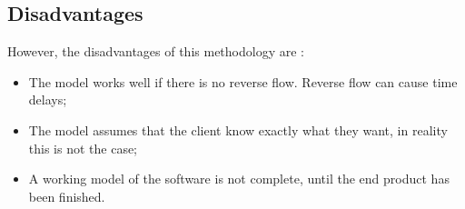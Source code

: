 \subsection{Disadvantages}
However, the disadvantages of this methodology are \citep{alam:2012:Online}:
\begin{itemize}
	\item The model works well if there is no reverse flow. Reverse flow can 
        cause time delays;
  \item The model assumes that the client know exactly what they want, in 
        reality this is not the case;
  \item A working model of the software is not complete, until the end product 
        has been finished.
\end{itemize}